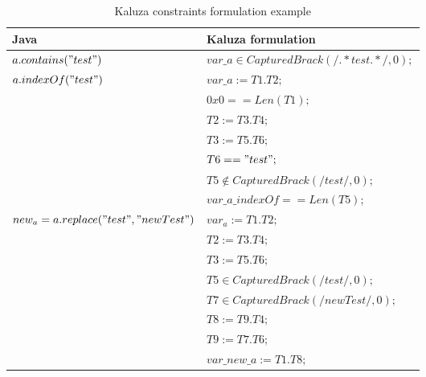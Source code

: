 \begin{table*}[t]
   \centering
    \begin{tabular}{|l|l|}
      \hline
      \textbf{Java} & \textbf{Kaluza formulation}\\
      \hline
      $a.contains("test")$ & $var\_a \in CapturedBrack(/.*test.*/, 0);$ \\
      \hline
      $a.indexOf("test")$ & $var\_a := T1 . T2;$ \\
                  & $0x0 == Len(T1);$ \\
                  & $T2 := T3 . T4;$ \\
                  & $T3 := T5 . T6;$ \\
                  & $T6 == "test";$ \\
                  & $T5 \notin CapturedBrack(/test/, 0);$ \\
              & $var\_a\_indexOf == Len(T5);$ \\
      \hline
      $new_a = a.replace("test", "newTest")$ & $var_a := T1 . T2;$ \\
                      & $T2 := T3 . T4;$ \\
                      & $T3 := T5 . T6;$ \\
                      & $T5 \in CapturedBrack(/test/, 0);$ \\
                      & $T7 \in CapturedBrack(/newTest/, 0);$ \\
                      & $T8 :=  T9 . T4;$ \\
                      & $T9 :=  T7 . T6;$ \\
                      & $var\_new\_a := T1 . T8;$ \\
      \hline
    \end{tabular}
    \caption{Kaluza constraints formulation example}
    \label{table:tabkaluza}
  \end{table*}

